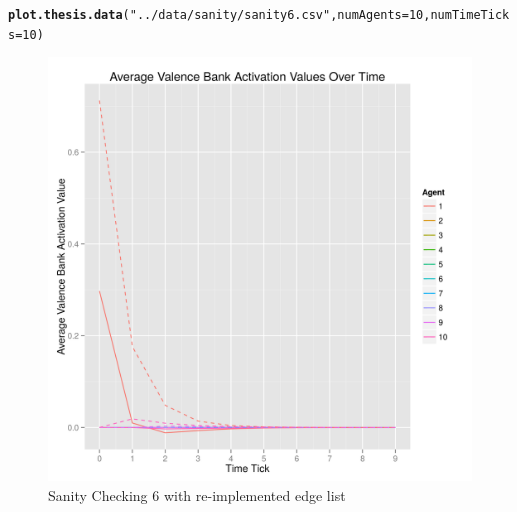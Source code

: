 \documentclass{article}\usepackage[]{graphicx}\usepackage[]{color}
\makeatletter
\def\maxwidth{ %
  \ifdim\Gin@nat@width>\linewidth
    \linewidth
  \else
    \Gin@nat@width
  \fi
}
\newcommand{\hlnum}[1]{\textcolor[rgb]{0.686,0.059,0.569}{#1}}%
\newcommand{\hlstr}[1]{\textcolor[rgb]{0.192,0.494,0.8}{#1}}%
\newcommand{\hlstd}[1]{\textcolor[rgb]{0.345,0.345,0.345}{#1}}%
\newcommand{\hlkwc}[1]{\textcolor[rgb]{0.333,0.667,0.333}{#1}}%
\newcommand{\hlkwd}[1]{\textcolor[rgb]{0.737,0.353,0.396}{\textbf{#1}}}%
\newenvironment{kframe}{%
 \def\at@end@of@kframe{}%
 \ifinner\ifhmode%
  \def\at@end@of@kframe{\end{minipage}}%
  \begin{minipage}{\columnwidth}%
 \fi\fi%
 \def\FrameCommand##1{\hskip\@totalleftmargin \hskip-\fboxsep
 \colorbox{shadecolor}{##1}\hskip-\fboxsep
     \hskip-\linewidth \hskip-\@totalleftmargin \hskip\columnwidth}%
 \MakeFramed {\advance\hsize-\width
   \@totalleftmargin\z@ \linewidth\hsize
   \@setminipage}}%
 {\par\unskip\endMakeFramed%
 \at@end@of@kframe}
\newenvironment{knitrout}{}{} %
\makeatother
\begin{document}
\begin{knitrout}
\color{fgcolor}\begin{kframe}
\begin{alltt}
\hlkwd{plot.thesis.data}\hlstd{(}\hlstr{"../data/sanity/sanity6.csv"}\hlstd{,} \hlkwc{numAgents} \hlstd{=} \hlnum{10}\hlstd{,} \hlkwc{numTimeTicks} \hlstd{=} \hlnum{10}\hlstd{)}
\end{alltt}
\end{kframe}\begin{figure}[]

\includegraphics[width=\maxwidth]{figure/plot-sanity-6} \caption[Sanity Checking 6 with re-implemented edge list]{Sanity Checking 6 with re-implemented edge list\label{fig:plot-sanity-6}}
\end{figure}


\end{knitrout}


\newpage
\end{document}
